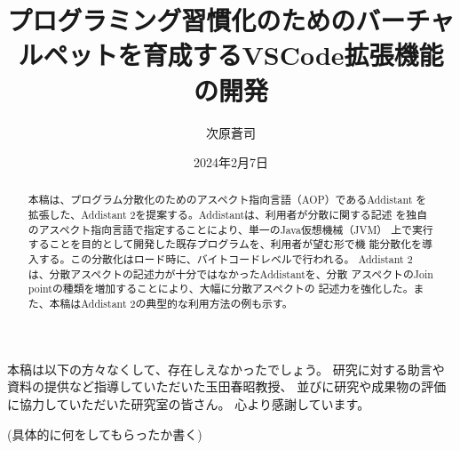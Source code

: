 \documentclass[12pt,twoside]{jbook}
\begin{document}
\title{%
  プログラミング習慣化のためのバーチャルペットを育成するVSCode拡張機能の開発
}


\author{%
  次原蒼司
}

\date{2024年2月7日}






\maketitle


\begin{abstract}
本稿は、プログラム分散化のためのアスペクト指向言語（AOP）であるAddistant%
を拡張した、Addistant 2を提案する。Addistantは、利用者が分散に関する記述
を独自のアスペクト指向言語で指定することにより、単一のJava仮想機械（JVM）
上で実行することを目的として開発した既存プログラムを、利用者が望む形で機
能分散化を導入する。この分散化はロード時に、バイトコードレベルで行われる。
Addistant 2は、分散アスペクトの記述力が十分ではなかったAddistantを、分散
アスペクトのJoin pointの種類を増加することにより、大幅に分散アスペクトの
記述力を強化した。また、本稿はAddistant 2の典型的な利用方法の例も示す。
\end{abstract}

\begin{acknowledgments}
本稿は以下の方々なくして、存在しえなかったでしょう。
研究に対する助言や資料の提供など指導していただいた玉田春昭教授、
並びに研究や成果物の評価に協力していただいた研究室の皆さん。
心より感謝しています。

(具体的に何をしてもらったか書く)

\end{acknowledgments}
\end{document}
